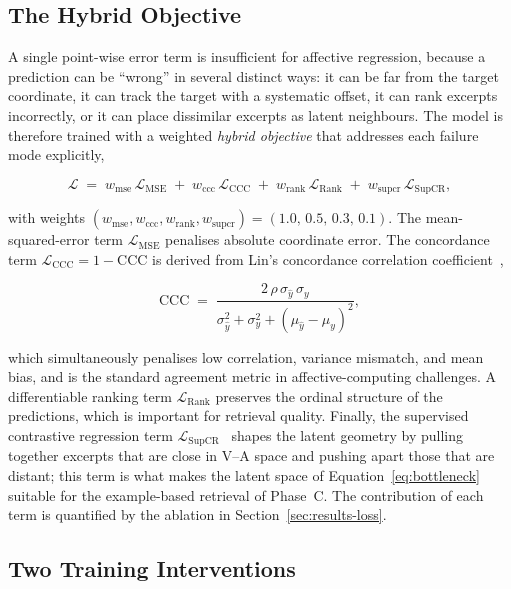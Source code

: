 \documentclass[12pt]{report}
\begin{document}
\subsection{The Hybrid Objective}
\label{sec:hybridloss}

A single point-wise error term is insufficient for affective regression, because a prediction can be ``wrong'' in several distinct ways: it can be far from the target coordinate, it can track the target with a systematic offset, it can rank excerpts incorrectly, or it can place dissimilar excerpts as latent neighbours. The model is therefore trained with a weighted \emph{hybrid objective} that addresses each failure mode explicitly,

\begin{equation}
\label{eq:hybrid}
\mathcal{L} \;=\; w_{\text{mse}}\,\mathcal{L}_{\text{MSE}}
\;+\; w_{\text{ccc}}\,\mathcal{L}_{\text{CCC}}
\;+\; w_{\text{rank}}\,\mathcal{L}_{\text{Rank}}
\;+\; w_{\text{supcr}}\,\mathcal{L}_{\text{SupCR}},
\end{equation}

with weights $(w_{\text{mse}},w_{\text{ccc}},w_{\text{rank}},w_{\text{supcr}}) = (1.0,\,0.5,\,0.3,\,0.1)$. The mean-squared-error term $\mathcal{L}_{\text{MSE}}$ penalises absolute coordinate error. The concordance term $\mathcal{L}_{\text{CCC}} = 1 - \text{CCC}$ is derived from Lin's concordance correlation coefficient~\cite{lin_ccc_1989},

\begin{equation}
\label{eq:ccc}
\text{CCC} \;=\; \frac{2\,\rho\,\sigma_{\hat{y}}\,\sigma_{y}}{\sigma_{\hat{y}}^{2} + \sigma_{y}^{2} + (\mu_{\hat{y}} - \mu_{y})^{2}},
\end{equation}

which simultaneously penalises low correlation, variance mismatch, and mean bias, and is the standard agreement metric in affective-computing challenges. A differentiable ranking term $\mathcal{L}_{\text{Rank}}$ preserves the ordinal structure of the predictions, which is important for retrieval quality. Finally, the supervised contrastive regression term $\mathcal{L}_{\text{SupCR}}$~\cite{zha_supcr_2023} shapes the latent geometry by pulling together excerpts that are close in V--A space and pushing apart those that are distant; this term is what makes the latent space of Equation~\ref{eq:bottleneck} suitable for the example-based retrieval of Phase~C. The contribution of each term is quantified by the ablation in Section~\ref{sec:results-loss}.

\subsection{Two Training Interventions}
\label{sec:training-fixes}
\end{document}
